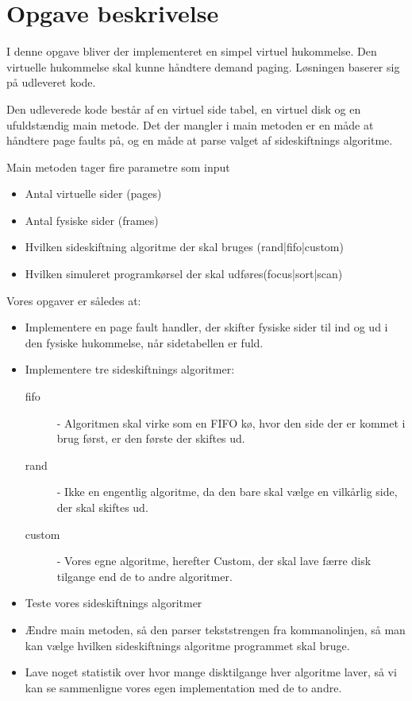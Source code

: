 \section{Opgave beskrivelse}

I denne opgave bliver der implementeret en simpel virtuel hukommelse. Den virtuelle hukommelse skal kunne håndtere demand paging. Løsningen baserer sig på udleveret kode.

Den udleverede kode består af en virtuel side tabel, en virtuel disk og en ufuldstændig main metode. Det der mangler i main metoden er en måde at håndtere page faults på, og en måde at parse valget af sideskiftnings algoritme.

Main metoden tager fire parametre som input

\begin{itemize}
\item Antal virtuelle sider (pages)
\item Antal fysiske sider (frames)
\item Hvilken sideskiftning algoritme der skal bruges (rand|fifo|custom)
\item Hvilken simuleret programkørsel der skal udføres(focus|sort|scan)
\end{itemize} 

Vores opgaver er således at:

\begin{itemize}
\item Implementere en page fault handler, der skifter fysiske sider til ind og ud i den fysiske hukommelse, når sidetabellen er fuld.

\item Implementere tre sideskiftnings algoritmer: 

\begin{description}
\item[fifo] - Algoritmen skal virke som en FIFO kø, hvor den side der er kommet i brug først, er den første der skiftes ud. 
\item[rand] - Ikke en engentlig algoritme, da den bare skal vælge en vilkårlig side, der skal skiftes ud.
\item[custom] - Vores egne algoritme, herefter Custom, der skal lave færre disk tilgange end de to andre algoritmer. 
\end{description}

\item Teste vores sideskiftnings algoritmer

\item Ændre main metoden, så den parser tekststrengen fra kommanolinjen, så man kan vælge hvilken sideskiftnings algoritme programmet skal bruge.

\item Lave noget statistik over hvor mange disktilgange hver algoritme laver, så vi kan se sammenligne vores egen implementation med de to andre.
\end{itemize}